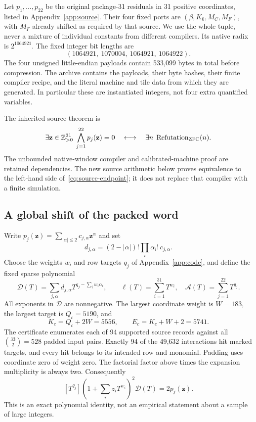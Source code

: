 \documentclass[11pt,a4paper]{article}
\theoremstyle{definition}\newtheorem{definition}[theorem]{Definition}
\theoremstyle{remark}\newtheorem{remark}[theorem]{Remark}
\newcommand{\code}[1]{\texttt{\small\detokenize{#1}}}
\begin{document}
Let $p_1,\ldots,p_{22}$ be the original package-31 residuals in 31 positive
coordinates, listed in Appendix~\ref{app:source}. Their four fixed ports
are $(\beta,K_0,M_C,M_F)$, with $M_F$ already shifted as required by that
source. We use the whole \code{wang943-mixed-121x8801} tuple, never a mixture
of individual constants from different compilers. Its native radix is
$2^{1064921}$. The fixed integer bit lengths are
\[
(1064921,\ 1070004,\ 1064921,\ 1064922).
\]
The four unsigned little-endian payloads contain 533,099 bytes in total
before compression. The archive contains the payloads, their byte hashes,
their finite compiler recipe, and the literal machine and tile data from
which they are generated. In particular these are instantiated integers,
not four extra quantified variables.

The inherited source theorem is
\begin{equation}\label{eq:source-endpoint}
 \exists\mathbf z\in\mathbb Z_{>0}^{31}\;\bigwedge_{j=1}^{22}p_j(\mathbf z)=0
 \quad\longleftrightarrow\quad
 \exists n\;\operatorname{Refutation}_{\mathrm{ZFC}}(n).
\end{equation}
The unbounded native-window compiler and calibrated-machine proof are
retained dependencies. The new source arithmetic below proves equivalence
to the left-hand side of~\eqref{eq:source-endpoint}; it does not replace
that compiler with a finite simulation.

\subsection{A global shift of the packed word}

Write $p_j(\mathbf z)=\sum_{|\alpha|\le2}c_{j,\alpha}\mathbf z^\alpha$ and set
\[
 d_{j,\alpha}=(2-|\alpha|)!\prod_i\alpha_i!\,c_{j,\alpha}.
\]
Choose the weights $w_i$ and row targets $q_j$ of Appendix~\ref{app:code},
and define the fixed sparse polynomial
\begin{equation}\label{eq:Dcode}
 \mathcal D(T)=\sum_{j,\alpha}d_{j,\alpha}
 T^{q_j-\sum_iw_i\alpha_i},\qquad
 \ell(T)=\sum_{i=1}^{31}T^{w_i},\quad
 \mathcal A(T)=\sum_{j=1}^{22}T^{q_j}.
\end{equation}
All exponents in $\mathcal D$ are nonnegative. The largest coordinate
weight is $W=183$, the largest target is $Q_c=5190$, and
\[
 K_c=Q_c+2W=5556,\qquad E_c=K_c+W+2=5741.
\]
The certificate enumerates each of 94 supported source records against all
$\binom{33}{2}=528$ padded input pairs. Exactly 94 of the 49,632
interactions hit marked targets, and every hit belongs to its intended row
and monomial. Padding uses coordinate zero of weight zero. The factorial
factor above times the expansion multiplicity is always two. Consequently
\begin{equation}\label{eq:extraction}
 [T^{q_j}]\left(1+\sum_i z_iT^{w_i}\right)^2\mathcal D(T)
 =2p_j(\mathbf z).
\end{equation}
This is an exact polynomial identity, not an empirical statement about a
sample of large integers.
\end{document}
